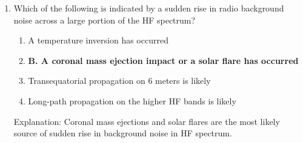 \begin{enumerate}
     \item Which of the following is indicated by a sudden rise in radio background noise across a large portion of the HF spectrum?
       \begin{enumerate}
      \item  A temperature inversion has occurred
         \item \textbf{B. A coronal mass ejection impact or a solar flare has occurred}
     \item  Transequatorial propagation on 6 meters is likely
        \item  Long-path propagation on the higher HF bands is likely
        \end{enumerate}
        \textcolor{myred}{Explanation:}
        Coronal mass ejections and solar flares are the most likely source of sudden rise in background noise in HF spectrum.

\end{enumerate}



